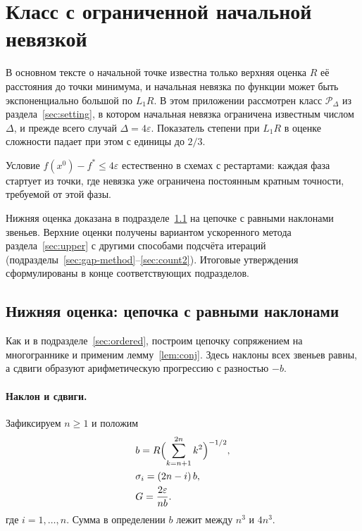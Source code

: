 \section{Класс с ограниченной начальной невязкой}\label{app:gap}

В основном тексте о начальной точке известна только верхняя оценка $R$ её расстояния до точки минимума, и начальная невязка по функции может быть экспоненциально большой по $L_1R$. В этом приложении рассмотрен класс $\mathcal P_\Delta$ из раздела~\ref{sec:setting}, в котором начальная невязка ограничена известным числом $\Delta$, и прежде всего случай $\Delta=4\varepsilon$. Показатель степени при $L_1R$ в оценке сложности падает при этом с единицы до $2/3$.

Условие $f(x^0)-f^\ast\le4\varepsilon$ естественно в схемах с рестартами: каждая фаза стартует из точки, где невязка уже ограничена постоянным кратным точности, требуемой от этой фазы.

Нижняя оценка доказана в подразделе~\ref{sec:eq-chain} на цепочке с равными наклонами звеньев. Верхние оценки получены вариантом ускоренного метода раздела~\ref{sec:upper} с другими способами подсчёта итераций (подразделы~\ref{sec:gap-method}--\ref{sec:count2}). Итоговые утверждения сформулированы в конце соответствующих подразделов.

\subsection{Нижняя оценка: цепочка с равными наклонами}\label{sec:eq-chain}

Как и в подразделе~\ref{sec:ordered}, построим цепочку сопряжением на многограннике и применим лемму~\ref{lem:conj}. Здесь наклоны всех звеньев равны, а сдвиги образуют арифметическую прогрессию с разностью $-b$.

\paragraph{Наклон и сдвиги.} Зафиксируем $n\ge1$ и положим
\begin{equation}\label{eq:eq-chain-params}
\begin{aligned}
 &b=R\Bigl(\sum_{k=n+1}^{2n}k^2\Bigr)^{-1/2},\\
 &\sigma_i=(2n-i)\,b,\\
 &G=\frac{2\varepsilon}{nb} .
\end{aligned}
\end{equation}
где $i=1,\dots,n$. Сумма в определении $b$ лежит между $n^3$ и $4n^3$.

